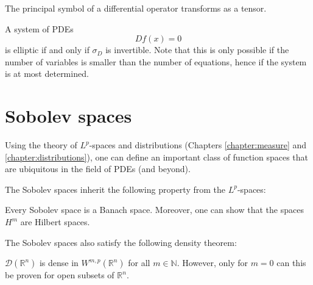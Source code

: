     \begin{property}
        The principal symbol of a differential operator transforms as a tensor.
    \end{property}
    \begin{definition}[Ellipticity]
        A system of PDEs \[Df(x) = 0\] is elliptic if and only if $\sigma_D$ is invertible. Note that this is only possible if the number of variables is smaller than the number of equations, hence if the system is at most determined.
    \end{definition}

\section{Sobolev spaces}

    Using the theory of $L^p$-spaces and distributions (Chapters \ref{chapter:measure} and \ref{chapter:distributions}), one can define an important class of function spaces that are ubiquitous in the field of PDEs (and beyond).


    The Sobolev spaces inherit the following property from the $L^p$-spaces:
    \begin{property}[Completeness]
        Every Sobolev space is a Banach space. Moreover, one can show that the spaces $H^m$ are Hilbert spaces.
    \end{property}
    The Sobolev spaces also satisfy the following density theorem:
    \begin{property}
        $\mathcal{D}(\mathbb{R}^n)$ is dense in $W^{m,p}(\mathbb{R}^n)$ for all $m\in\mathbb{N}$. However, only for $m=0$ can this be proven for open subsets of $\mathbb{R}^n$.
    \end{property}

